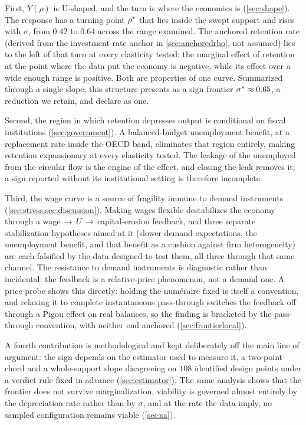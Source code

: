 First, $Y(\rho)$ is U-shaped, and the turn is where the economics is (\cref{sec:shape}). The response has a turning point $\rho^{\ast}$ that lies inside the swept support and rises with $\sigma$, from $0.42$ to $0.64$ across the range examined. The anchored retention rate (derived from the investment-rate anchor in \cref{sec:anchoredrho}, not assumed) lies to the left of that turn at every elasticity tested: the marginal effect of retention at the point where the data put the economy is negative, while its effect over a wide enough range is positive. Both are properties of one curve.
Summarized through a single slope, this structure presents as a sign frontier $\sigma^{\ast} \approx 0.65$, a reduction we retain, and declare as one.

Second, the region in which retention depresses output is conditional on fiscal institutions (\cref{sec:government}). A balanced-budget unemployment benefit, at a replacement rate inside the OECD band, eliminates that region entirely, making retention expansionary at every elasticity tested. The leakage of the unemployed from the circular flow is the engine of the effect, and closing the leak removes it; a sign reported without its institutional setting is therefore incomplete.

Third, the wage curve is a source of fragility immune to demand instruments (\cref{sec:stress,sec:discussion}). Making wages flexible destabilizes the economy through a wage$\,\to\,U\,\to\,$capital-erosion feedback, and three separate stabilization hypotheses aimed at it (slower demand expectations, the unemployment benefit, and that benefit as a cushion against firm heterogeneity) are each falsified by the data designed to test them, all three through that same channel. The resistance to demand instruments is diagnostic rather than incidental: the feedback is a relative-price phenomenon, not a demand one. A price probe shows this directly: holding the numéraire fixed is itself a convention, and relaxing it to complete instantaneous pass-through switches the feedback off through a Pigou effect on real balances, so the finding is bracketed by the pass-through convention, with neither end anchored (\cref{sec:frontierlocal}).

A fourth contribution is methodological and kept deliberately off the main line of argument: the sign depends on the estimator used to measure it, a two-point chord and a whole-support slope disagreeing on $108$ identified design points under a verdict rule fixed in advance (\cref{sec:estimator}). The same analysis shows that the frontier does not survive marginalization, viability is governed almost entirely by the depreciation rate rather than by $\sigma$, and at the rate the data imply, no sampled configuration remains viable (\cref{sec:sa}).

